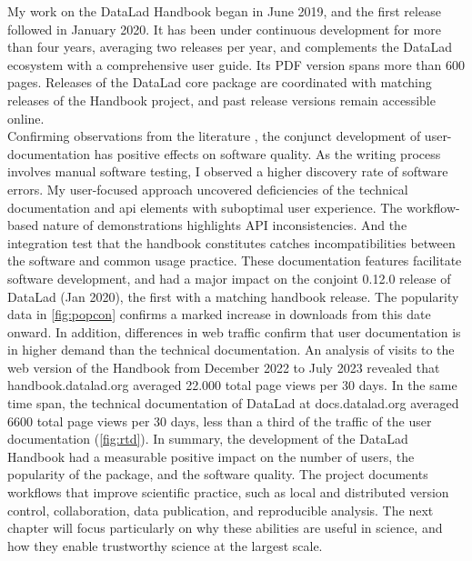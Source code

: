 My work on the DataLad Handbook began in June 2019, and the first release followed in January 2020.
It has been under continuous development for more than four years, averaging two releases per year, and complements  the DataLad ecosystem with a comprehensive user guide.
Its PDF version spans more than 600 pages.
Releases of the DataLad core package are coordinated with matching releases of the Handbook project, and past release versions remain accessible online.\\
Confirming observations from the literature \citep{loggemDDD}, the conjunct development of user-documentation has positive effects on software quality.
As the writing process involves manual software testing, I observed a higher discovery rate of software errors.
My user-focused approach uncovered deficiencies of the technical documentation and \gls{api} elements with suboptimal user experience.
The workflow-based nature of demonstrations highlights API inconsistencies.
And the integration test that the handbook constitutes catches incompatibilities between the software and common usage practice.
These documentation features facilitate software development, and had a major impact on the conjoint 0.12.0 release of DataLad (Jan 2020), the first with a matching handbook release.
The popularity data in \cref{fig:popcon} confirms a marked increase in downloads from this date onward.
In addition, differences in web traffic confirm that user documentation is in higher demand than the technical documentation.
An analysis of visits to the web version of the Handbook from December 2022 to July 2023 revealed that handbook.datalad.org averaged 22.000 total page views per 30 days.
In the same time span, the technical documentation of DataLad at docs.datalad.org averaged 6600 total page views per 30 days, less than a third of the traffic of the user documentation (\cref{fig:rtd}).
In summary, the development of the DataLad Handbook had a measurable positive impact on the number of users, the popularity of the package, and the software quality.
The project documents workflows that improve scientific practice, such as local and distributed version control, collaboration, data publication, and reproducible analysis.
The next chapter will focus particularly on why these abilities are useful in science, and how they enable trustworthy science at the largest scale.


